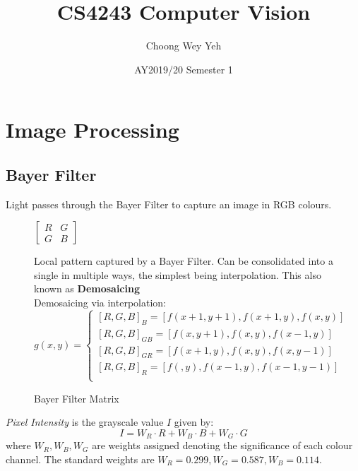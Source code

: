 \documentclass[12pt]{article}
\title{CS4243 Computer Vision}
\date{AY2019/20 Semester 1}
\author{Choong Wey Yeh}
\begin{document}
\maketitle

\section{Image Processing}

\subsection{Bayer Filter}
Light passes through the Bayer Filter to capture an image in RGB colours. \\

\begin{figure}[ht]
\begin{minipage}[t]{0.3\linewidth}
\centering
$ \begin{bmatrix} R&G\\ G&B \end{bmatrix}$
\caption*{Bayer Filter Matrix}
\label{GIS_Mapping_Software}
\end{minipage}%
\begin{minipage}[t]{0.7\linewidth}
Local pattern captured by a Bayer Filter. Can be consolidated into a single in multiple ways, the simplest being interpolation. This also known as \textbf{Demosaicing} \\

Demosaicing via interpolation: 
\[
g(x, y) =
\begin{cases}
[R, G, B]_B = [ f(x + 1, y + 1), f(x + 1, y), f(x, y)]\\
[R, G, B]_{GB} = [ f(x, y + 1), f(x, y), f(x - 1, y)]\\
[R, G, B]_{GR} = [ f(x + 1, y), f(x, y), f(x, y - 1)]\\
[R, G, B]_R = [ f(, y), f(x - 1, y), f(x - 1, y - 1)]\\
\end{cases}
\]
\end{minipage}
\end{figure}

\textit{Pixel Intensity} is the grayscale value $I$ given by:
\begin{equation} 
I = W_R \cdot R + W_B \cdot B + W_G \cdot G
\end{equation}
where $W_R, W_B, W_G$ are weights assigned denoting the significance of each colour channel. The standard weights are $W_R = 0.299, W_G = 0.587, W_B = 0.114$.\\
\end{document}
